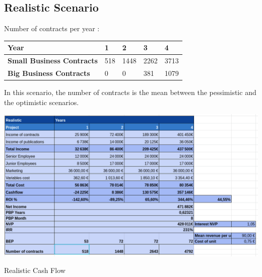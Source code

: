 \documentclass[./main.tex]{subfiles}
\begin{document}
\subsection{Realistic Scenario}
Number of contracts per year : 
\begin{table}[H]
	\centering
\begin{tabular}{|l|l|l|l|l|}
\hline
\textbf{Year}                     & 1  & 2   & 3   & 4   \\ \hline
\textbf{Small Business Contracts} & 518 & 1448 & 2262 & 3713 \\ \hline
\textbf{Big Business Contracts}   & 0  & 0   & 381  & 1079 \\ \hline
\end{tabular}
\end{table}
In this scenario, the number of contracts is the mean between the pessimistic and the optimistic scenarios.
\begin{table}[H]
	\centering
	\includegraphics[width=14cm]{img/mean.png}
	\caption{Realistic Cash Flow}
	\label{tab:realistic}
\end{table}
\end{document}
